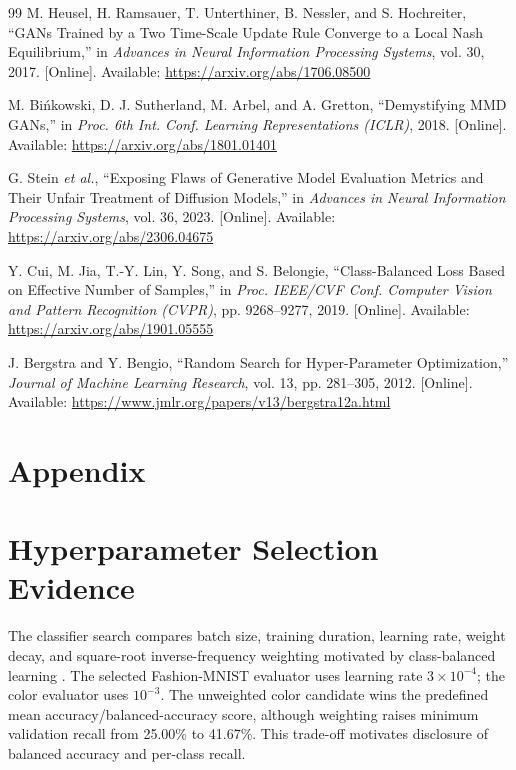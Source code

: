 \documentclass{article}
\begin{document}
\begin{thebibliography}{99}
 M. Heusel, H. Ramsauer, T. Unterthiner, B. Nessler, and S. Hochreiter, ``GANs Trained by a Two Time-Scale Update Rule Converge to a Local Nash Equilibrium,'' in \emph{Advances in Neural Information Processing Systems}, vol. 30, 2017. [Online]. Available: \url{https://arxiv.org/abs/1706.08500}

 M. Bi\'nkowski, D. J. Sutherland, M. Arbel, and A. Gretton, ``Demystifying MMD GANs,'' in \emph{Proc. 6th Int. Conf. Learning Representations (ICLR)}, 2018. [Online]. Available: \url{https://arxiv.org/abs/1801.01401}

 G. Stein \emph{et al.}, ``Exposing Flaws of Generative Model Evaluation Metrics and Their Unfair Treatment of Diffusion Models,'' in \emph{Advances in Neural Information Processing Systems}, vol. 36, 2023. [Online]. Available: \url{https://arxiv.org/abs/2306.04675}

 Y. Cui, M. Jia, T.-Y. Lin, Y. Song, and S. Belongie, ``Class-Balanced Loss Based on Effective Number of Samples,'' in \emph{Proc. IEEE/CVF Conf. Computer Vision and Pattern Recognition (CVPR)}, pp. 9268--9277, 2019. [Online]. Available: \url{https://arxiv.org/abs/1901.05555}

 J. Bergstra and Y. Bengio, ``Random Search for Hyper-Parameter Optimization,'' \emph{Journal of Machine Learning Research}, vol. 13, pp. 281--305, 2012. [Online]. Available: \url{https://www.jmlr.org/papers/v13/bergstra12a.html}
\end{thebibliography}

\clearpage
\appendix
\section*{Appendix}

\section{Hyperparameter Selection Evidence}
\label{app:tuning}
The classifier search compares batch size, training duration, learning rate, weight decay, and square-root inverse-frequency weighting motivated by class-balanced learning \citep{cui2019classbalanced}. The selected Fashion-MNIST evaluator uses learning rate $3\times10^{-4}$; the color evaluator uses $10^{-3}$. The unweighted color candidate wins the predefined mean accuracy/balanced-accuracy score, although weighting raises minimum validation recall from 25.00\% to 41.67\%. This trade-off motivates disclosure of balanced accuracy and per-class recall.
\end{document}
